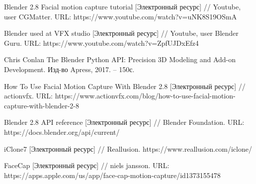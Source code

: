 \begingroup 
\renewcommand{\section}[2]{\anonsection{Библиографический список}}
\begin{thebibliography}{00}

    Blender 2.8 Facial motion capture tutorial
    [Электронный ресурс] //
    Youtube, user CGMatter.
    URL: https://www.youtube.com/watch?v=uNK8S19OSmA
    
	Blender used at VFX studio
	[Электронный ресурс] //
	Youtube, user Blender Guru.
	URL: https://www.youtube.com/watch?v=ZpfUJDxEfz4

	Chris Conlan
	The Blender Python API: Precision 3D Modeling and Add-on Development.
    Изд-во Apress, 2017. -- 150с.

    How To Use Facial Motion Capture With Blender 2.8
    [Электронный ресурс] //
    actionvfx.
    URL: https://www.actionvfx.com/blog/how-to-use-facial-motion-capture-with-blender-2-8
    
	Blender 2.8 API reference
	[Электронный ресурс] //
	Blender Foundation.
	URL: https://docs.blender.org/api/current/
	
	iClone7
	[Электронный ресурс] //
	Reallusion.
	https://www.reallusion.com/iclone/
	
	FaceCap
	[Электронный ресурс] //
	niels jansson.	
	URL: https://apps.apple.com/us/app/face-cap-motion-capture/id1373155478

\end{thebibliography}
\endgroup

\clearpage
